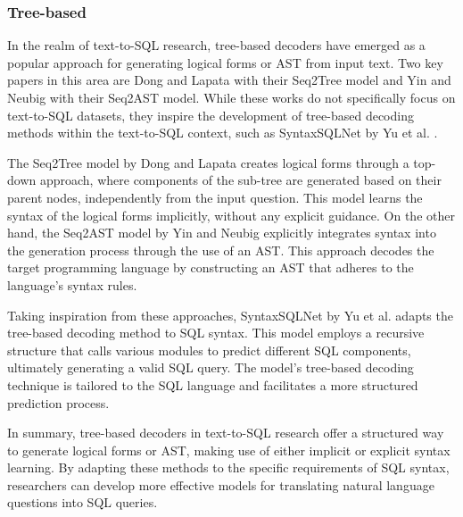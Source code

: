 \subsubsection{Tree-based}

In the realm of text-to-SQL research, tree-based decoders have emerged as a popular approach for generating logical forms or \ac{AST} from input text. Two key papers in this area are Dong and Lapata  \cite{dong-lapata-2016-language} with their Seq2Tree model and Yin and Neubig  \cite{yin-neubig-2017-syntactic} with their Seq2AST model. While these works do not specifically focus on text-to-SQL datasets, they inspire the development of tree-based decoding methods within the text-to-SQL context, such as SyntaxSQLNet by Yu et al.  \cite{DBLP:journals/corr/abs-1810-05237}.

The Seq2Tree model by Dong and Lapata  \cite{dong-lapata-2016-language} creates logical forms through a top-down approach, where components of the sub-tree are generated based on their parent nodes, independently from the input question. This model learns the syntax of the logical forms implicitly, without any explicit guidance. On the other hand, the Seq2AST model by Yin and Neubig   \cite{yin-neubig-2017-syntactic} explicitly integrates syntax into the generation process through the use of an AST. This approach decodes the target programming language by constructing an AST that adheres to the language's syntax rules.

Taking inspiration from these approaches, SyntaxSQLNet by Yu et al.  \cite{DBLP:journals/corr/abs-1810-05237} adapts the tree-based decoding method to SQL syntax. This model employs a recursive structure that calls various modules to predict different SQL components, ultimately generating a valid SQL query. The model's tree-based decoding technique is tailored to the SQL language and facilitates a more structured prediction process.

In summary, tree-based decoders in text-to-SQL research offer a structured way to generate logical forms or AST, making use of either implicit or explicit syntax learning. By adapting these methods to the specific requirements of SQL syntax, researchers can develop more effective models for translating natural language questions into SQL queries.